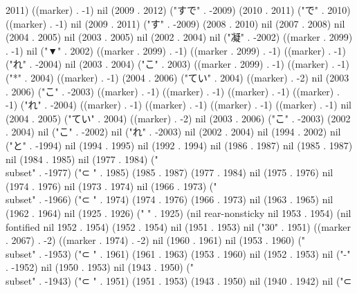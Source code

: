 2011) ((marker) . -1) nil (2009 . 2012) ("すで" . -2009) (2010 . 2011) ("で" . 2010) ((marker) . -1) nil (2009 . 2011) ("す" . -2009) (2008 . 2010) nil (2007 . 2008) nil (2004 . 2005) nil (2003 . 2005) nil (2002 . 2004) nil ("凝" . -2002) ((marker . 2099) . -1) nil ("▼" . 2002) ((marker . 2099) . -1) ((marker . 2099) . -1) ((marker) . -1) ("れ" . -2004) nil (2003 . 2004) ("こ" . 2003) ((marker . 2099) . -1) ((marker) . -1) ("*" . 2004) ((marker) . -1) (2004 . 2006) ("てい" . 2004) ((marker) . -2) nil (2003 . 2006) ("こ" . -2003) ((marker) . -1) ((marker) . -1) ((marker) . -1) ((marker) . -1) ("れ" . -2004) ((marker) . -1) ((marker) . -1) ((marker) . -1) ((marker) . -1) nil (2004 . 2005) ("てい" . 2004) ((marker) . -2) nil (2003 . 2006) ("こ" . -2003) (2002 . 2004) nil ("こ" . -2002) nil ("れ" . -2003) nil (2002 . 2004) nil (1994 . 2002) nil ("と" . -1994) nil (1994 . 1995) nil (1992 . 1994) nil (1986 . 1987) nil (1985 . 1987) nil (1984 . 1985) nil (1977 . 1984) ("\\subset" . -1977) ("⊂
" . 1985) (1985 . 1987) (1977 . 1984) nil (1975 . 1976) nil (1974 . 1976) nil (1973 . 1974) nil (1966 . 1973) ("\\subset" . -1966) ("⊂
" . 1974) (1974 . 1976) (1966 . 1973) nil (1963 . 1965) nil (1962 . 1964) nil (1925 . 1926) ("  " . 1925) (nil rear-nonsticky nil 1953 . 1954) (nil fontified nil 1952 . 1954) (1952 . 1954) nil (1951 . 1953) nil ("30" . 1951) ((marker . 2067) . -2) ((marker . 1974) . -2) nil (1960 . 1961) nil (1953 . 1960) ("\\subset" . -1953) ("⊂
" . 1961) (1961 . 1963) (1953 . 1960) nil (1952 . 1953) nil ("-" . -1952) nil (1950 . 1953) nil (1943 . 1950) ("\\subset" . -1943) ("⊂
" . 1951) (1951 . 1953) (1943 . 1950) nil (1940 . 1942) nil ("⊂
